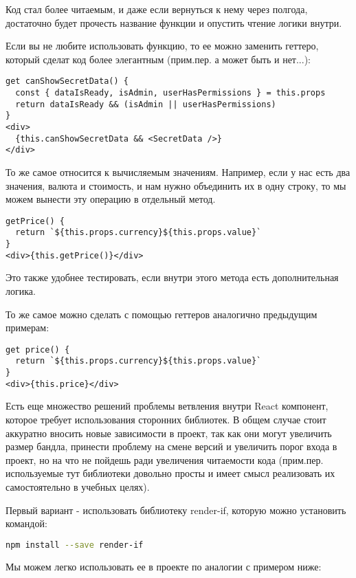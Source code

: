 Код стал более читаемым, и даже если вернуться к нему через полгода, достаточно будет прочесть название функции и опустить чтение логики внутри.

Если вы не любите использовать функцию, то ее можно заменить геттеро, который сделат код более элегантным (прим.пер. а может быть и нет...):

\begin{lstlisting}
get canShowSecretData() {
  const { dataIsReady, isAdmin, userHasPermissions } = this.props
  return dataIsReady && (isAdmin || userHasPermissions)
}
<div>
  {this.canShowSecretData && <SecretData />}
</div>
\end{lstlisting}

То же самое относится к вычисляемым значениям. Например, если у нас есть два значения, валюта и стоимость, и нам нужно объединить их в одну строку, то мы можем вынести эту операцию в отдельный метод.

\begin{lstlisting}
getPrice() {
  return `${this.props.currency}${this.props.value}`
}
<div>{this.getPrice()}</div>
\end{lstlisting}

Это также удобнее тестировать, если внутри этого метода есть дополнительная логика.

То же самое можно сделать с помощью геттеров аналогично предыдущим примерам:

\begin{lstlisting}
get price() {
  return `${this.props.currency}${this.props.value}`
}
<div>{this.price}</div>
\end{lstlisting}

Есть еще множество решений проблемы ветвления внутри React компонент, которое требует использования сторонних библиотек. В общем случае стоит аккуратно вносить новые зависимости в проект, так как они могут увеличить размер бандла, принести проблему на смене версий и увеличить порог входа в проект, но на что не пойдешь ради увеличения читаемости кода (прим.пер. используемые тут библиотеки довольно просты и имеет смысл реализовать их самостоятельно в учебных целях).

Первый вариант - использовать библиотеку render-if, которую можно установить командой:
\begin{lstlisting}[language=bash]
npm install --save render-if
\end{lstlisting}

Мы можем легко использовать ее в проекте по аналогии с примером ниже:

